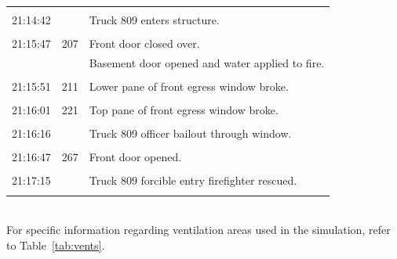 \documentclass[12pt,oneside]{book}
\begin{document}
\begin{table}[!ht]
\begin{tabular}{ccl}
               &              &                                                                      \\
21:14:42       &              &  Truck 809 enters structure.                                         \\
               &              &                                                                      \\
21:15:47       &  207         &  Front door closed over.                                             \\
               &              &  Basement door opened and water applied to fire.                     \\
               &              &                                                                      \\
21:15:51       &  211         &  Lower pane of front egress window broke.                            \\
               &              &                                                                      \\
21:16:01       &  221         &  Top pane of front egress window broke.                              \\
               &              &                                                                      \\
21:16:16       &              &  Truck 809 officer bailout through window.                           \\
               &              &                                                                      \\
21:16:47       &  267         &  Front door opened.                                                  \\
               &              &                                                                      \\
21:17:15       &              &  Truck 809 forcible entry firefighter rescued.                       \\
               &              &                                                                      \\
\bottomrule
\end{tabular}
\footnotesize
\\ For specific information regarding ventilation areas used in the simulation, refer to Table~\ref{tab:vents}.
\normalsize
\label{tab:combined_timeline}
\end{table}
\end{document}
